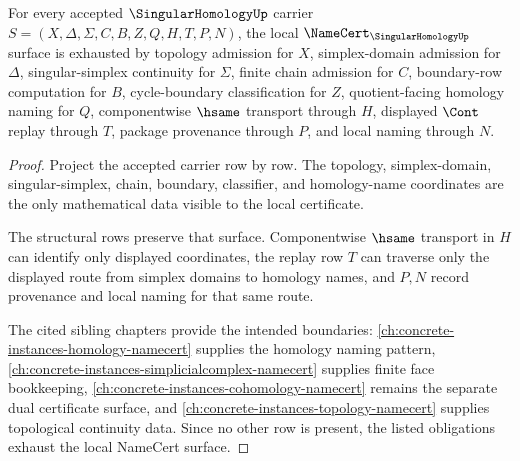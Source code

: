 \begin{theorem}\label{thm:singular-homology-namecert-obligations}
For every accepted $\SingularHomologyUp$ carrier $S=(X,\Delta,\Sigma,C,B,Z,Q,H,T,P,N)$, the local $\NameCert_{\SingularHomologyUp}$ surface is exhausted by topology admission for $X$, simplex-domain admission for $\Delta$, singular-simplex continuity for $\Sigma$, finite chain admission for $C$, boundary-row computation for $B$, cycle-boundary classification for $Z$, quotient-facing homology naming for $Q$, componentwise $\hsame$ transport through $H$, displayed $\Cont$ replay through $T$, package provenance through $P$, and local naming through $N$.
\end{theorem}
\begin{proof}
Project the accepted carrier row by row. The topology, simplex-domain, singular-simplex, chain, boundary, classifier, and homology-name coordinates are the only mathematical data visible to the local certificate.

The structural rows preserve that surface. Componentwise $\hsame$ transport in $H$ can identify only displayed coordinates, the replay row $T$ can traverse only the displayed route from simplex domains to homology names, and $P,N$ record provenance and local naming for that same route.

The cited sibling chapters provide the intended boundaries: \autoref{ch:concrete-instances-homology-namecert} supplies the homology naming pattern, \autoref{ch:concrete-instances-simplicialcomplex-namecert} supplies finite face bookkeeping, \autoref{ch:concrete-instances-cohomology-namecert} remains the separate dual certificate surface, and \autoref{ch:concrete-instances-topology-namecert} supplies topological continuity data. Since no other row is present, the listed obligations exhaust the local NameCert surface.
\end{proof}

